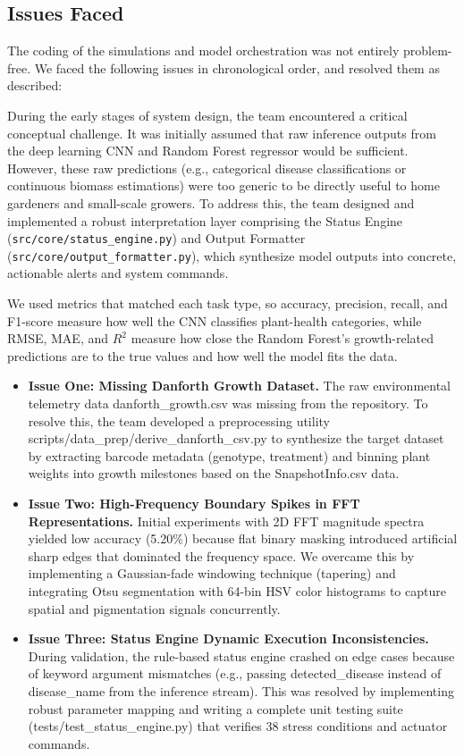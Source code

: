 \documentclass[11pt,a4paper]{article}
\begin{document}
\subsection{Issues Faced} \label{sec:issue}
The coding of the simulations and model orchestration was not entirely problem-free. We faced the following issues in chronological order, and resolved them as described:

During the early stages of system design, the team encountered a critical conceptual challenge. It was initially assumed that raw inference outputs from the deep learning CNN and Random Forest regressor would be sufficient. However, these raw predictions (e.g., categorical disease classifications or continuous biomass estimations) were too generic to be directly useful to home gardeners and small-scale growers. To address this, the team designed and implemented a robust interpretation layer comprising the Status Engine (\texttt{src/core/status\_engine.py}) and Output Formatter (\texttt{src/core/output\_formatter.py}), which synthesize model outputs into concrete, actionable alerts and system commands.

We used metrics that matched each task type, so accuracy, precision, recall, and F1-score measure how well the CNN classifies plant-health categories, while RMSE, MAE, and $R^2$ measure how close the Random Forest’s growth-related predictions are to the true values and how well the model fits the data.

\begin{itemize}
    \item \textbf{Issue One: Missing Danforth Growth Dataset.} The raw environmental telemetry data \textsf{danforth\_growth.csv} was missing from the repository. To resolve this, the team developed a preprocessing utility \textsf{scripts/data\_prep/derive\_danforth\_csv.py} to synthesize the target dataset by extracting barcode metadata (genotype, treatment) and binning plant weights into growth milestones based on the \textsf{SnapshotInfo.csv} data.
    \item \textbf{Issue Two: High-Frequency Boundary Spikes in FFT Representations.} Initial experiments with 2D FFT magnitude spectra yielded low accuracy (5.20\%) because flat binary masking introduced artificial sharp edges that dominated the frequency space. We overcame this by implementing a Gaussian-fade windowing technique (tapering) and integrating Otsu segmentation with 64-bin HSV color histograms to capture spatial and pigmentation signals concurrently.
    \item \textbf{Issue Three: Status Engine Dynamic Execution Inconsistencies.} During validation, the rule-based status engine crashed on edge cases because of keyword argument mismatches (e.g., passing \textsf{detected\_disease} instead of \textsf{disease\_name} from the inference stream). This was resolved by implementing robust parameter mapping and writing a complete unit testing suite (\textsf{tests/test\_status\_engine.py}) that verifies 38 stress conditions and actuator commands.
\end{itemize}
\end{document}
